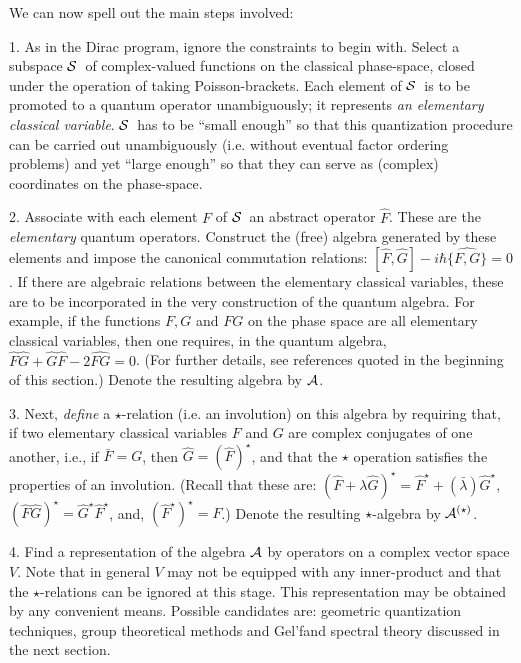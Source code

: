 \def\cS{${\cal S}$}
We can now spell out the main steps involved:\hfill\break
\item{1.} As in the Dirac program, ignore the constraints to begin with.
Select a subspace \cS\ of complex-valued functions on the classical
phase-space, closed under the operation of taking Poisson-brackets. Each
element of \cS\ is to be promoted to a quantum operator unambiguously; it
represents {\it an elementary classical variable}. \cS\ has to be ``small
enough'' so that this quantization procedure can be carried out unambiguously
(i.e. without eventual factor ordering problems) and yet ``large enough'' so
that they can serve as (complex) coordinates on the phase-space.
\item{2.} Associate with each element $F$ of \cS\ an abstract operator $\hat
F$.
These are the {\it elementary} quantum operators. Construct the (free) algebra
generated by these elements and impose the canonical commutation relations:
$[\hat F ,\hat G ]-i\hbar\widehat{\{F,G\}}=0$. If there are algebraic relations
between the elementary classical variables, these are to be incorporated in
the very construction of the quantum algebra. For example, if the functions
$F, G$ and $FG$ on the phase space are all elementary classical variables,
then one requires, in the quantum algebra, $\hat{F}\hat{G} +\hat{G}\hat{F}
-2\widehat{FG} =0$. (For further details, see references quoted in the
beginning of this section.) Denote the resulting algebra by ${\cal A}$.
\item{3.} Next, {\it define} a $\star$-relation (i.e. an involution) on this
algebra by requiring that, if two elementary classical variables $F$ and $G$
are complex conjugates of one another, i.e., if $\bar{F}= G$, then $\hat G
= (\hat F)^\star$, and that the $\star$ operation satisfies the properties
of an involution. (Recall that these are: $(\hat{F} +\lambda \hat{G})^\star
= \hat{F}^\star + (\bar{\lambda}) \hat{G}^\star$, $(\hat{F} \hat{G})^\star =
\hat{G}^\star \hat{F}^\star$, and, $(\hat{F}^\star)^\star = F$.) Denote the
resulting $\star$-algebra by ${\cal A}^{(\star)}$.
\item{4.} Find a representation of the algebra ${\cal A}$ by operators on a
complex vector space $V$. Note that in general $V$ may not be equipped with
any inner-product and that the $\star$-relations can be ignored at this stage.
This representation may be obtained by any convenient means. Possible
candidates are: geometric quantization techniques, group theoretical methods
and Gel'fand spectral theory discussed in the next section.
